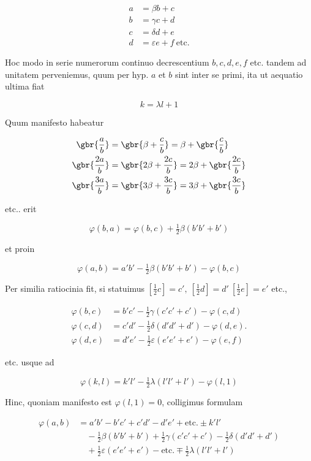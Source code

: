 %
\[
\begin{aligned}
a&=\beta b+c\\
b&=\gamma c+d\\
c&=\delta d+e\\
d&=\varepsilon e+f\ \text{etc.}
\end{aligned}
\]

Hoc modo in serie numerorum continuo decrescentium $b,c,d,e,f$ etc. tandem ad unitatem perveniemus, quum per hyp. $a$ et $b$ sint inter se primi, ita ut aequatio ultima fiat

\[
k=\lambda l+1
\]

Quum manifesto habeatur

\[
\begin{aligned}
\gbr{\frac ab}&=\gbr{\beta+\frac cb}=\beta+\gbr{\frac cb}\\
\gbr{\frac{2a}b}&=\gbr{2\beta+\frac{2c}b}=2\beta+\gbr{\frac{2c}b}\\
\gbr{\frac{3a}b}&=\gbr{3\beta+\frac{3c}b}=3\beta+\gbr{\frac{3c}b}
\end{aligned}
\]

etc.. erit

\[
\varphi(b,a)=\varphi(b,c)+\tfrac12\beta(b'b'+b')
\]

et proin

\[
\varphi(a,b)=a'b'-\tfrac12\beta(b'b'+b')-\varphi(b,c)
\]

Per similia ratiocinia fit, si statuimus $[\frac12c]=c',\ [\frac12d]=d'\ [\frac12e]=e'$ etc.,

\[
\begin{aligned}
\varphi(b,c)&=b'c'-\tfrac12\gamma(c'c'+c')-\varphi(c,d)\\
\varphi(c,d)&=c'd'-\tfrac12\delta(d'd'+d')-\varphi(d,e)\mathord{.}\\
\varphi(d,e)&=d'e'-\tfrac12\varepsilon(e'e'+e')-\varphi(e,f)
\end{aligned}
\]

etc. usque ad

\[
\varphi(k,l)=k'l'-\tfrac12\lambda(l'l'+l')-\varphi(l,1)
\]

Hinc, quoniam manifesto est $\varphi(l,1)=0$, colligimus formulam

\[
\begin{aligned}
\varphi(a,b)&=a'b'-b'c'+c'd'-d'e'+\text{etc.}\pm k'l'\\
&\quad-\tfrac12\beta(b'b'+b')+\tfrac12\gamma(c'c'+c')-\tfrac12\delta(d'd'+d')\\
&\quad+\tfrac12\varepsilon(e'e'+e')-\text{etc.}\mp\tfrac12\lambda(l'l'+l')
\end{aligned}
\]

